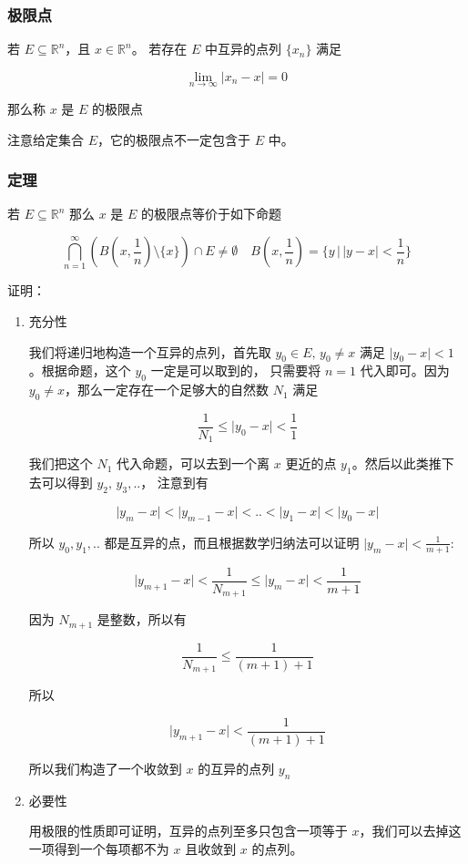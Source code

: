 \documentclass[12pt,a4paper]{ctexart}
\begin{document}
\subsubsection{极限点}

若 $E \subseteq \mathbb{R}^n$，且 $x \in \mathbb{R}^n$。 若存在 $E$ 中互异的点列 $\{ x_n \}$ 满足

\[
\lim_{n \to \infty} \lvert x_n - x \rvert = 0
\]

那么称 $x$ 是 $E$ 的极限点

注意给定集合 $E$，它的极限点不一定包含于 $E$ 中。

\subsubsection{定理}

若 $E \subseteq \mathbb{R}^n$ 那么 $x$ 是 $E$ 的极限点等价于如下命题

\[
\bigcap_{n = 1}^{\infty} \left( B(x, \frac{1}{n}) \setminus \{ x \} \right) \cap E \ne \emptyset \quad B(x,\frac{1}{n}) = \{ y \, \vert \, \lvert y-x\rvert < \frac{1}{n} \}
\]


证明：

\begin{enumerate}
    \item 充分性

    我们将递归地构造一个互异的点列，首先取 $y_0 \in E,\, y_0 \ne x$ 满足 $\lvert y_0 -x \rvert < 1$。根据命题，这个 $y_0$ 一定是可以取到的，
    只需要将 $n=1$ 代入即可。因为 $y_0 \ne x$，那么一定存在一个足够大的自然数 $N_1$ 满足  

    \[
        \frac{1}{N_1} \le \lvert y_0 - x\rvert < \frac{1}{1}
    \]

    我们把这个 $N_1$ 代入命题，可以去到一个离 $x$ 更近的点 $y_1$。然后以此类推下去可以得到 $y_2,\, y_3, ..$，
    注意到有

    \[
    \lvert y_{m} -x \rvert <\lvert y_{m-1} -x \rvert < .. < \lvert y_{1} -x \rvert < \lvert y_{0} -x \rvert
    \]

    所以 $y_0,y_1, ..$ 都是互异的点，而且根据数学归纳法可以证明 $\lvert y_{m} - x\rvert < \frac{1}{m+1}$:

    \[
        \lvert y_{m+1} - x\rvert < \frac{1}{N_{m+1}} \le \lvert y_m -x \rvert < \frac{1}{m+1}
    \]

    因为 $N_{m+1}$ 是整数，所以有

    \[
        \frac{1}{N_{m+1}} \le \frac{1}{(m+1) + 1}
    \]

    所以

    \[
        \lvert y_{m+1} - x\rvert < \frac{1}{(m+1) + 1}
    \]

    所以我们构造了一个收敛到 $x$ 的互异的点列 $y_n$

    \item 必要性

    用极限的性质即可证明，互异的点列至多只包含一项等于 $x$，我们可以去掉这一项得到一个每项都不为 $x$
    且收敛到 $x$ 的点列。

\end{enumerate}
\end{document}
